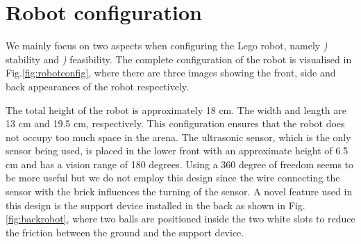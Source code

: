 \documentclass[12pt]{article}
\begin{document}
\section{Robot configuration}
We mainly focus on two aspects when configuring the Lego robot, namely {\itshape {})} stability and {\itshape {})} feasibility. The complete configuration of the robot is visualised in Fig.\ref{fig:robotconfig}, where there are three images showing the front, side and back appearances of the robot respectively. 

The total height of the robot is approximately 18 cm. The width and length are 13 cm and 19.5 cm, respectively. This configuration ensures that the robot does not occupy too much space in the arena. The ultrasonic sensor, which is the only sensor being used, is placed in the lower front with an approximate height of 6.5 cm and has a vision range of 180 degrees. Using a 360 degree of freedom seems to be more useful but we do not employ this design since the wire connecting the sensor with the brick influences the turning of the sensor. A novel feature used in this design is the support device installed in the back as shown in Fig.\ref{fig:backrobot}, where two balls are positioned inside the two white slots to reduce the friction between the ground and the support device. 
\end{document}
